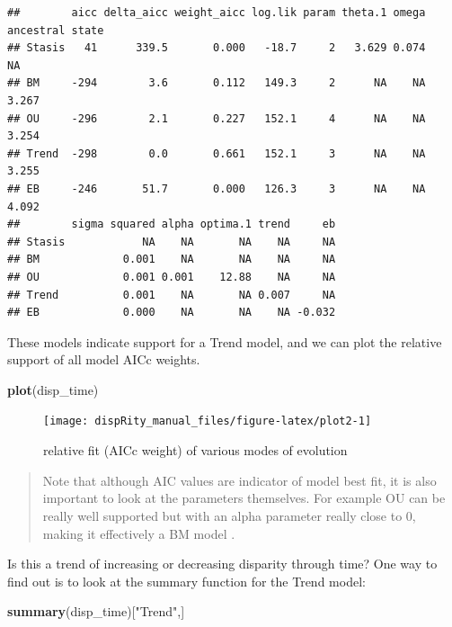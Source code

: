 \documentclass[]{book}
\newenvironment{Shaded}{\begin{snugshade}}{\end{snugshade}}
\newcommand{\KeywordTok}[1]{\textcolor[rgb]{0.13,0.29,0.53}{\textbf{#1}}}
\newcommand{\NormalTok}[1]{#1}
\newcommand{\StringTok}[1]{\textcolor[rgb]{0.31,0.60,0.02}{#1}}
\begin{document}
\begin{verbatim}
##        aicc delta_aicc weight_aicc log.lik param theta.1 omega ancestral state
## Stasis   41      339.5       0.000   -18.7     2   3.629 0.074              NA
## BM     -294        3.6       0.112   149.3     2      NA    NA           3.267
## OU     -296        2.1       0.227   152.1     4      NA    NA           3.254
## Trend  -298        0.0       0.661   152.1     3      NA    NA           3.255
## EB     -246       51.7       0.000   126.3     3      NA    NA           4.092
##        sigma squared alpha optima.1 trend     eb
## Stasis            NA    NA       NA    NA     NA
## BM             0.001    NA       NA    NA     NA
## OU             0.001 0.001    12.88    NA     NA
## Trend          0.001    NA       NA 0.007     NA
## EB             0.000    NA       NA    NA -0.032
\end{verbatim}

These models indicate support for a Trend model, and we can plot the relative support of all model AICc weights.

\begin{Shaded}
\begin{Highlighting}[]
\KeywordTok{plot}\NormalTok{(disp_time)}
\end{Highlighting}
\end{Shaded}

\begin{figure}

{\centering \texttt{[image: dispRity\_manual\_files/figure-latex/plot2-1]} 

}

\caption{relative fit (AICc weight) of various modes of evolution}\label{fig:plot2}
\end{figure}

\begin{quote}
Note that although AIC values are indicator of model best fit, it is also important to look at the parameters themselves.
For example OU can be really well supported but with an alpha parameter really close to 0, making it effectively a BM model \citep{Cooper2016}.
\end{quote}

Is this a trend of increasing or decreasing disparity through time? One way to find out is to look at the summary function for the Trend model:

\begin{Shaded}
\begin{Highlighting}[]
\KeywordTok{summary}\NormalTok{(disp_time)[}\StringTok{"Trend"}\NormalTok{,]}
\end{Highlighting}
\end{Shaded}
\end{document}
